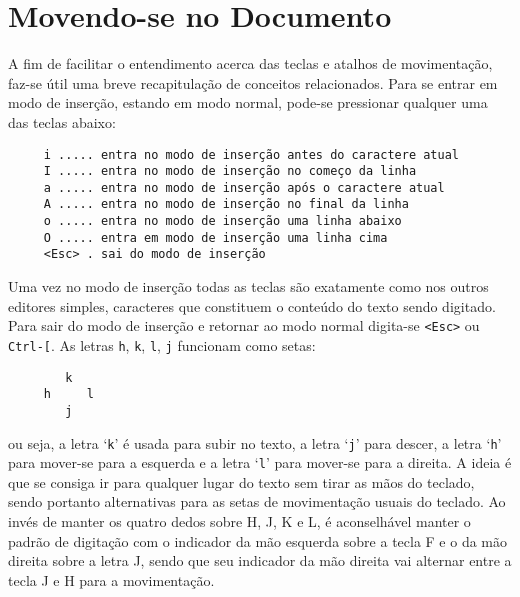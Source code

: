 
\chapter{Movendo-se no Documento}
\label{cha:Movendo-se no Documento}

A fim de facilitar o entendimento acerca das teclas e atalhos de movimentação,
faz-se útil uma breve recapitulação de conceitos relacionados. Para se entrar
em modo de inserção, estando em modo normal, pode-se pressionar qualquer uma
das teclas abaixo:
\begin{verbatim}
     i ..... entra no modo de inserção antes do caractere atual
     I ..... entra no modo de inserção no começo da linha
     a ..... entra no modo de inserção após o caractere atual
     A ..... entra no modo de inserção no final da linha
     o ..... entra no modo de inserção uma linha abaixo
     O ..... entra em modo de inserção uma linha cima
     <Esc> . sai do modo de inserção
\end{verbatim}

Uma vez no modo de inserção todas as teclas são exatamente como nos outros
editores simples, caracteres que constituem o conteúdo do texto sendo digitado.
Para sair do modo de inserção e retornar ao modo normal digita-se \verb+<Esc>+
ou \verb+Ctrl-[+. As letras {\tt h}, {\tt k}, {\tt l}, {\tt j} funcionam como
setas:

\begin{verbatim}
        k
     h     l
        j
\end{verbatim}
ou seja, a letra `{\tt k}' é usada para subir no texto, a letra `{\tt j}' para descer,
a letra `{\tt h}' para mover-se para a esquerda e a letra `{\tt l}' para mover-se para
a direita. A ideia é que se consiga ir para qualquer lugar do texto sem tirar
as mãos do teclado, sendo portanto alternativas para as setas de movimentação
usuais do teclado. Ao invés de manter os quatro dedos sobre H, J, K e L, é aconselhável 
manter o padrão de digitação com o indicador da mão esquerda sobre a tecla F e o da mão
direita sobre a letra J, sendo que seu indicador da mão direita vai alternar entre a
tecla J e H para a movimentação. 

